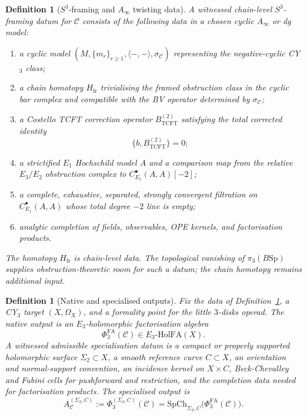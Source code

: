 \documentclass[11pt]{article}
\newtheorem{definition}[theorem]{Definition}
\begin{document}
\begin{definition}[$S^3$-framing and $A_\infty$ twisting data]
\label{def:s3-ainfty-datum}
A witnessed chain-level $S^3$-framing datum for $\mathcal C$ consists
of the following data in a chosen cyclic $A_\infty$ or dg model:
\begin{enumerate}[label=\textup{(\roman*)}]
\item a cyclic model
$(M,\{m_r\}_{r\geq 1},\langle-,-\rangle,\sigma_{\mathcal C})$
representing the negative-cyclic CY$_3$ class;
\item a chain homotopy $H_{\mathrm{fr}}$ trivialising the framed
obstruction class in the cyclic bar complex and compatible with the BV
operator determined by $\sigma_{\mathcal C}$;
\item a Costello TCFT correction operator
$B^{(2)}_{\mathrm{TCFT}}$ satisfying the total corrected identity
\[
  \{b,B^{(2)}_{\mathrm{TCFT}}\}=0;
\]
\item a strictified $E_1$ Hochschild model $A$ and a comparison map from
the relative $E_3/E_2$ obstruction complex to
$C^\bullet_{E_1}(A,A)[-2]$;
\item a complete, exhaustive, separated, strongly convergent filtration
on $C^\bullet_{E_1}(A,A)$ whose total degree $-2$ line is empty;
\item analytic completion of fields, observables, OPE kernels, and
factorisation products.
\end{enumerate}
The homotopy $H_{\mathrm{fr}}$ is chain-level data.  The topological
vanishing of $\pi_3(B\mathrm{Sp})$ supplies obstruction-theoretic room
for such a datum; the chain homotopy remains additional input.
\end{definition}

\begin{definition}[Native and specialised outputs]
\label{def:native-specialised}
Fix the data of Definition~\ref{def:s3-ainfty-datum}, a CY$_3$ target
$(X,\Omega_X)$, and a formality point for the little $3$-disks operad.
The native output is an $E_3$-holomorphic factorisation algebra
\[
  \Phi^{\mathrm{FA}}_3(\mathcal C)\in E_3\text{-}\mathrm{HolFA}(X).
\]
A witnessed admissible specialisation datum is a compact or properly
supported holomorphic surface $\Sigma_2\subset X$, a smooth reference
curve $C\subset X$, an orientation and normal-support convention, an
incidence kernel on $X\times C$, Beck-Chevalley and Fubini cells for
pushforward and restriction, and the completion data needed for
factorisation products.  The specialised output is
\[
  A_{\mathcal C}^{(\Sigma_2,C)}
  :=
  \Phi^{(\Sigma_2,C)}_3(\mathcal C)
  =
  \mathrm{SpCh}_{\Sigma_2,C}\bigl(\Phi^{\mathrm{FA}}_3(\mathcal C)\bigr).
\]
\end{definition}
\end{document}
